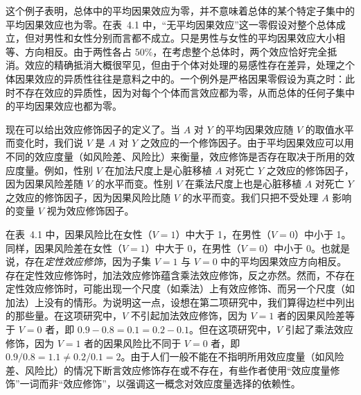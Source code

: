 这个例子表明，总体中的平均因果效应为零，并不意味着总体的某个特定子集中的平均因果效应也为零。在表~4.1 中，“无平均因果效应”这一零假设对整个总体成立，但对男性和女性分别而言都不成立。只是男性与女性的平均因果效应大小相等、方向相反。由于两性各占 $50\%$，在考虑整个总体时，两个效应恰好完全抵消。效应的精确抵消大概很罕见，但由于个体对处理的易感性存在差异，处理之个体因果效应的异质性往往是意料之中的。一个例外是严格因果零假设为真之时：此时不存在效应的异质性，因为对每个个体而言效应都为零，从而总体的任何子集中的平均因果效应也都为零。

现在可以给出效应修饰因子的定义了。当 $A$ 对 $Y$ 的平均因果效应随 $V$ 的取值水平而变化时，我们说 $V$ 是 $A$ 对 $Y$ 之效应的一个修饰因子。由于平均因果效应可以用不同的效应度量（如风险差、风险比）来衡量，效应修饰是否存在取决于所用的效应度量。例如，性别 $V$ 在加法尺度上是心脏移植 $A$ 对死亡 $Y$ 之效应的修饰因子，因为因果风险差随 $V$ 的水平而变。性别 $V$ 在乘法尺度上也是心脏移植 $A$ 对死亡 $Y$ 之效应的修饰因子，因为因果风险比随 $V$ 的水平而变。我们只把不受处理 $A$ 影响的变量 $V$ 视为效应修饰因子。

在表~4.1 中，因果风险比在女性（$V=1$）中大于 1，在男性（$V=0$）中小于 1。同样，因果风险差在女性（$V=1$）中大于 0，在男性（$V=0$）中小于 0。也就是说，存在\emph{定性效应修饰}，因为子集 $V=1$ 与 $V=0$ 中的平均因果效应方向相反。存在定性效应修饰时，加法效应修饰蕴含乘法效应修饰，反之亦然。然而，不存在定性效应修饰时，可能出现一个尺度（如乘法）上有效应修饰、而另一个尺度（如加法）上没有的情形。为说明这一点，设想在第二项研究中，我们算得边栏中列出的那些量。在这项研究中，$V$ 不引起加法效应修饰，因为 $V=1$ 者的因果风险差等于 $V=0$ 者，即 $0.9-0.8=0.1=0.2-0.1$。但在这项研究中，$V$ 引起了乘法效应修饰，因为 $V=1$ 者的因果风险比不同于 $V=0$ 者，即 $0.9/0.8=1.1\neq 0.2/0.1=2$。由于人们一般不能在不指明所用效应度量（如风险差、风险比）的情况下断言效应修饰存在或不存在，有些作者使用“效应度量修饰”一词而非“效应修饰”，以强调这一概念对效应度量选择的依赖性。

